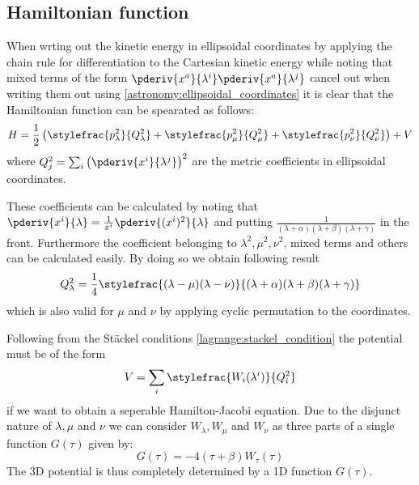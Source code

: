     \subsection{Hamiltonian function}
    When wrting out the kinetic energy in ellipsoidal coordinates by applying the chain rule for differentiation to the Cartesian kinetic energy while noting that mixed terms of the form $\pderiv{x^a}{\lambda^i}\pderiv{x^a}{\lambda^j}$ cancel out when writing them out using \ref{astronomy:ellipsoidal_coordinates} it is clear that the Hamiltonian function can be spearated as follows:
    \begin{equation}
    	H = \frac{1}{2}\left(\stylefrac{p_\lambda^2}{Q_\lambda^2} + \stylefrac{p_\mu^2}{Q_\mu^2} + \stylefrac{p_\nu^2}{Q_\nu^2}\right) + V
    \end{equation}
    where $Q_j^2 = \sum_i\left(\pderiv{x^i}{\lambda^j}\right)^2$ are the metric coefficients in ellipsoidal coordinates.
    
    These coefficients can be calculated by noting that $\pderiv{x^i}{\lambda} = \frac{1}{x^i}\pderiv{(x^i)^2}{\lambda}$ and putting $\frac{1}{(\lambda + \alpha)(\lambda + \beta)(\lambda + \gamma)}$ in the front. Furthermore the coefficient belonging to $\lambda^2, \mu^2, \nu^2$, mixed terms and others can be calculated easily. By doing so we obtain following result
    \begin{equation}
    	Q_\lambda^2 = \frac{1}{4}\stylefrac{(\lambda - \mu)(\lambda - \nu)}{(\lambda + \alpha)(\lambda + \beta)(\lambda + \gamma)}
    \end{equation}
    which is also valid for $\mu$ and $\nu$ by applying cyclic permutation to the coordinates.
    
    Following from the St\"ackel conditions \ref{lagrange:stackel_condition} the potential must be of the form
    \begin{equation}
    	V = \sum_i\stylefrac{W_i(\lambda^i)}{Q_i^2}
    \end{equation}
    if we want to obtain a seperable Hamilton-Jacobi equation. Due to the disjunct nature of $\lambda, \mu$ and $\nu$ we can consider $W_\lambda, W_\mu$ and $W_\nu$ as three parts of a single function $G(\tau)$ given by:
    \begin{equation}
    	G(\tau) = -4(\tau + \beta)W_\tau(\tau)
    \end{equation}
    The 3D potential is thus completely determined by a 1D function $G(\tau)$.
    
